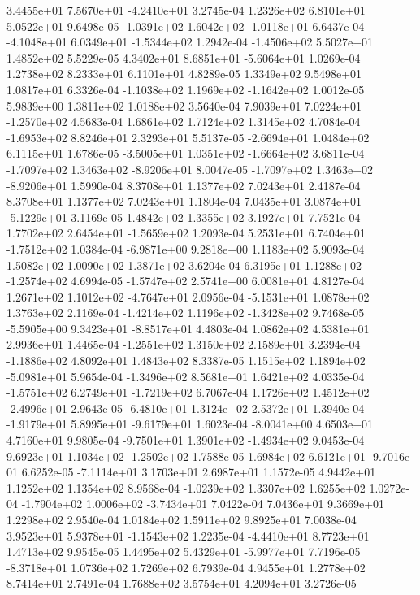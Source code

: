  3.4455e+01  7.5670e+01 -4.2410e+01  3.2745e-04
1.2326e+02 6.8101e+01 5.0522e+01  9.6498e-05
-1.0391e+02  1.6042e+02 -1.0118e+01  6.6437e-04
-4.1048e+01  6.0349e+01 -1.5344e+02  1.2942e-04
-1.4506e+02  5.5027e+01  1.4852e+02  5.5229e-05
 4.3402e+01  8.6851e+01 -5.6064e+01  1.0269e-04
1.2738e+02 8.2333e+01 6.1101e+01  4.8289e-05
1.3349e+02 9.5498e+01 1.0817e+01  6.3326e-04
-1.1038e+02  1.1969e+02 -1.1642e+02  1.0012e-05
5.9839e+00 1.3811e+02 1.0188e+02  3.5640e-04
 7.9039e+01  7.0224e+01 -1.2570e+02  4.5683e-04
1.6861e+02 1.7124e+02 1.3145e+02  4.7084e-04
-1.6953e+02  8.8246e+01  2.3293e+01  5.5137e-05
-2.6694e+01  1.0484e+02  6.1115e+01  1.6786e-05
-3.5005e+01  1.0351e+02 -1.6664e+02  3.6811e-04
-1.7097e+02  1.3463e+02 -8.9206e+01  8.0047e-05
-1.7097e+02  1.3463e+02 -8.9206e+01  1.5990e-04
8.3708e+01 1.1377e+02 7.0243e+01  2.4187e-04
8.3708e+01 1.1377e+02 7.0243e+01  1.1804e-04
 7.0435e+01  3.0874e+01 -5.1229e+01  3.1169e-05
1.4842e+02 1.3355e+02 3.1927e+01  7.7521e-04
 1.7702e+02  2.6454e+01 -1.5659e+02  1.2093e-04
 5.2531e+01  6.7404e+01 -1.7512e+02  1.0384e-04
-6.9871e+00  9.2818e+00  1.1183e+02  5.9093e-04
1.5082e+02 1.0090e+02 1.3871e+02  3.6204e-04
 6.3195e+01  1.1288e+02 -1.2574e+02  4.6994e-05
-1.5747e+02  2.5741e+00  6.0081e+01  4.8127e-04
 1.2671e+02  1.1012e+02 -4.7647e+01  2.0956e-04
-5.1531e+01  1.0878e+02  1.3763e+02  2.1169e-04
-1.4214e+02  1.1196e+02 -1.3428e+02  9.7468e-05
-5.5905e+00  9.3423e+01 -8.8517e+01  4.4803e-04
1.0862e+02 4.5381e+01 2.9936e+01  1.4465e-04
-1.2551e+02  1.3150e+02  2.1589e+01  3.2394e-04
-1.1886e+02  4.8092e+01  1.4843e+02  8.3387e-05
 1.1515e+02  1.1894e+02 -5.0981e+01  5.9654e-04
-1.3496e+02  8.5681e+01  1.6421e+02  4.0335e-04
-1.5751e+02  6.2749e+01 -1.7219e+02  6.7067e-04
 1.1726e+02  1.4512e+02 -2.4996e+01  2.9643e-05
-6.4810e+01  1.3124e+02  2.5372e+01  1.3940e-04
-1.9179e+01  5.8995e+01 -9.6179e+01  1.6023e-04
-8.0041e+00  4.6503e+01  4.7160e+01  9.9805e-04
-9.7501e+01  1.3901e+02 -1.4934e+02  9.0453e-04
 9.6923e+01  1.1034e+02 -1.2502e+02  1.7588e-05
 1.6984e+02  6.6121e+01 -9.7016e-01  6.6252e-05
-7.1114e+01  3.1703e+01  2.6987e+01  1.1572e-05
4.9442e+01 1.1252e+02 1.1354e+02  8.9568e-04
-1.0239e+02  1.3307e+02  1.6255e+02  1.0272e-04
-1.7904e+02  1.0006e+02 -3.7434e+01  7.0422e-04
7.0436e+01 9.3669e+01 1.2298e+02  2.9540e-04
1.0184e+02 1.5911e+02 9.8925e+01  7.0038e-04
 3.9523e+01  5.9378e+01 -1.1543e+02  1.2235e-04
-4.4410e+01  8.7723e+01  1.4713e+02  9.9545e-05
 1.4495e+02  5.4329e+01 -5.9977e+01  7.7196e-05
-8.3718e+01  1.0736e+02  1.7269e+02  6.7939e-04
4.9455e+01 1.2778e+02 8.7414e+01  2.7491e-04
1.7688e+02 3.5754e+01 4.2094e+01  3.2726e-05

